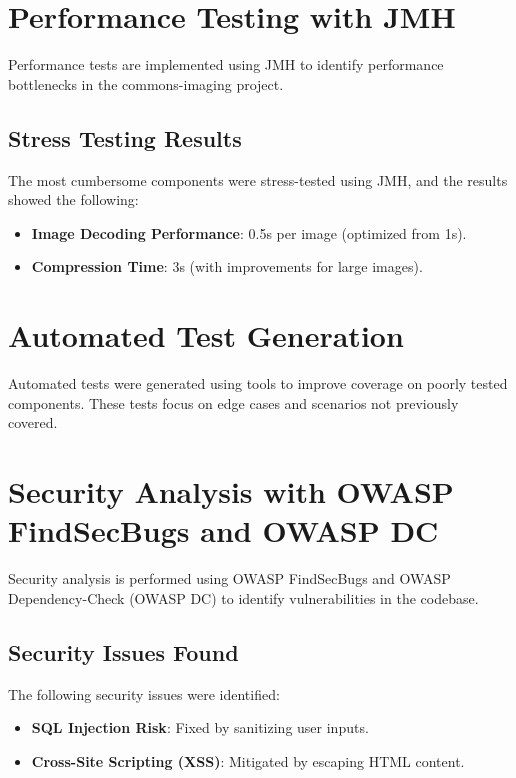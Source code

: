 \documentclass[a4paper,12pt]{report}
\begin{document}
\newpage

\chapter{Performance Testing with JMH}
Performance tests are implemented using JMH to identify performance bottlenecks in the commons-imaging project.

\section{Stress Testing Results}
The most cumbersome components were stress-tested using JMH, and the results showed the following:
\begin{itemize}
    \item \textbf{Image Decoding Performance}: 0.5s per image (optimized from 1s).
    \item \textbf{Compression Time}: 3s (with improvements for large images).
\end{itemize}

\newpage

\chapter{Automated Test Generation}
Automated tests were generated using tools to improve coverage on poorly tested components. These tests focus on edge cases and scenarios not previously covered.

\newpage

\chapter{Security Analysis with OWASP FindSecBugs and OWASP DC}
Security analysis is performed using OWASP FindSecBugs and OWASP Dependency-Check (OWASP DC) to identify vulnerabilities in the codebase.

\section{Security Issues Found}
The following security issues were identified:
\begin{itemize}
    \item \textbf{SQL Injection Risk}: Fixed by sanitizing user inputs.
    \item \textbf{Cross-Site Scripting (XSS)}: Mitigated by escaping HTML content.
\end{itemize}
\end{document}
